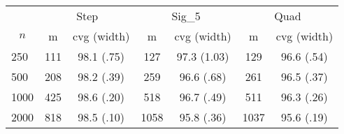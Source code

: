 \documentclass{article}
\begin{document}
\begin{tabular}{lcccccc}
   \toprule
 
           & \multicolumn{2}{c}{Step}& \multicolumn{2}{c}{Sig\_5}& \multicolumn{2}{c}{Quad} \\ 
             \cmidrule(l{2pt}r{2pt}){2-3} \cmidrule(l{2pt}r{2pt}){4-5} \cmidrule(l{2pt}r{2pt}){6-7} 
             \multicolumn{1}{c}{$n$} & \multicolumn{1}{c}{m}& \multicolumn{1}{c}{cvg (width)}& \multicolumn{1}{c}{m}& \multicolumn{1}{c}{cvg (width)}& \multicolumn{1}{c}{m}& \multicolumn{1}{c}{cvg (width)} \\ \midrule 
        250 & 111 & 98.1 (.75) & 127 & 97.3 (1.03) & 129 & 96.6 (.54) \\ 
  500 & 208 & 98.2 (.39) & 259 & 96.6 (.68) & 261 & 96.5 (.37) \\ 
  1000 & 425 & 98.6 (.20) & 518 & 96.7 (.49) & 511 & 96.3 (.26) \\ 
  2000 & 818 & 98.5 (.10) & 1058 & 95.8 (.36) & 1037 & 95.6 (.19) \\ 
   \hline
\end{tabular}
\end{document}
